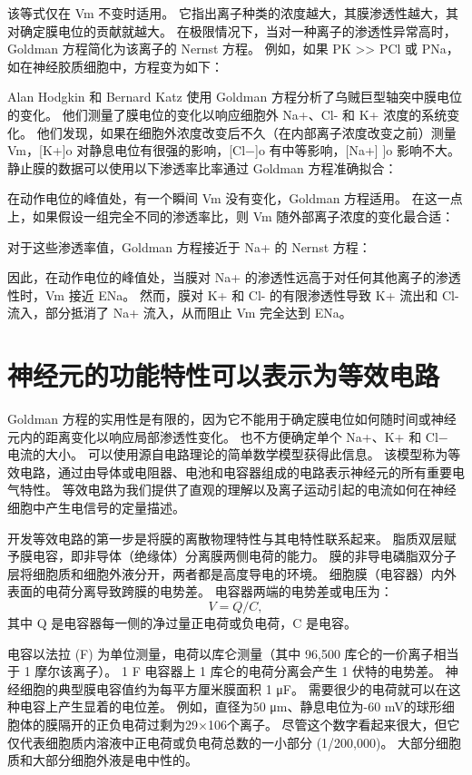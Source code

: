 该等式仅在 Vm 不变时适用。 
它指出离子种类的浓度越大，其膜渗透性越大，其对确定膜电位的贡献就越大。 
在极限情况下，当对一种离子的渗透性异常高时，Goldman 方程简化为该离子的 Nernst 方程。 
例如，如果 PK >> PCl 或 PNa，如在神经胶质细胞中，方程变为如下：


Alan Hodgkin 和 Bernard Katz 使用 Goldman 方程分析了乌贼巨型轴突中膜电位的变化。 
他们测量了膜电位的变化以响应细胞外 Na+、Cl- 和 K+ 浓度的系统变化。 
他们发现，如果在细胞外浓度改变后不久（在内部离子浓度改变之前）测量 Vm，[K+]o 对静息电位有很强的影响，[Cl−]o 有中等影响，[Na+] ]o 影响不大。 
静止膜的数据可以使用以下渗透率比率通过 Goldman 方程准确拟合：


在动作电位的峰值处，有一个瞬间 Vm 没有变化，Goldman 方程适用。 
在这一点上，如果假设一组完全不同的渗透率比，则 Vm 随外部离子浓度的变化最合适：


对于这些渗透率值，Goldman 方程接近于 Na+ 的 Nernst 方程：


因此，在动作电位的峰值处，当膜对 Na+ 的渗透性远高于对任何其他离子的渗透性时，Vm 接近 ENa。 
然而，膜对 K+ 和 Cl- 的有限渗透性导致 K+ 流出和 Cl- 流入，部分抵消了 Na+ 流入，从而阻止 Vm 完全达到 ENa。



\section{神经元的功能特性可以表示为等效电路}
Goldman 方程的实用性是有限的，因为它不能用于确定膜电位如何随时间或神经元内的距离变化以响应局部渗透性变化。 
也不方便确定单个 Na+、K+ 和 Cl− 电流的大小。 
可以使用源自电路理论的简单数学模型获得此信息。 
该模型称为等效电路，通过由导体或电阻器、电池和电容器组成的电路表示神经元的所有重要电气特性。 
等效电路为我们提供了直观的理解以及离子运动引起的电流如何在神经细胞中产生电信号的定量描述。


开发等效电路的第一步是将膜的离散物理特性与其电特性联系起来。 
脂质双层赋予膜电容，即非导体（绝缘体）分离膜两侧电荷的能力。 
膜的非导电磷脂双分子层将细胞质和细胞外液分开，两者都是高度导电的环境。 
细胞膜（电容器）内外表面的电荷分离导致跨膜的电势差。 
电容器两端的电势差或电压为：
\begin{equation}
	V = Q/C,
\end{equation}
其中 Q 是电容器每一侧的净过量正电荷或负电荷，C 是电容。


电容以法拉 (F) 为单位测量，电荷以库仑测量（其中 96,500 库仑的一价离子相当于 1 摩尔该离子）。 
1 F 电容器上 1 库仑的电荷分离会产生 1 伏特的电势差。 
神经细胞的典型膜电容值约为每平方厘米膜面积 1 μF。 
需要很少的电荷就可以在这种电容上产生显着的电位差。 
例如，直径为50 μm、静息电位为-60 mV的球形细胞体的膜隔开的正负电荷过剩为29×106个离子。 
尽管这个数字看起来很大，但它仅代表细胞质内溶液中正电荷或负电荷总数的一小部分 (1/200,000)。 
大部分细胞质和大部分细胞外液是电中性的。


